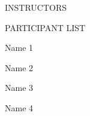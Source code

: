 \documentclass[11pt]{report}
\begin{document}
\begin{multicols}{2}
    \begin{flushleft} 



    \end{flushleft}
\end{multicols}


\begin{center} INSTRUCTORS \end{center}

\begin{multicols}{2}
    \begin{flushleft} 



    \end{flushleft}
\end{multicols}

\newpage

\begin{center} PARTICIPANT LIST \end{center}

\begin{multicols}{2}
    \begin{flushleft} 
        Name 1

        Name 2

        Name 3

        Name 4
    \end{flushleft}
\end{multicols}

\newpage

\tableofcontents


\end{document}

